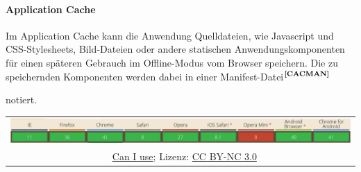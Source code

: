 \paragraph{Application Cache}
Im Application Cache kann die Anwendung Quelldateien, wie Javascript und CSS-Stylesheets, Bild-Dateien oder andere statischen Anwendungskomponenten für einen späteren Gebrauch im Offline-Modus vom Browser speichern. Die zu speichernden Komponenten werden dabei in einer Manifest-Datei$^{\textbf{\ref{CACMAN}}}$%
\addtocounter{footnote}{1}%
notiert. 
	\begin{table}[H]
  		\begin{adjustwidth}{-1.5cm}{1.5cm}
		\centering
		\begin{tabulary}{20cm}{C}
	  		\includegraphics[scale=0.6]{bilder/screenshots/caniuse_appcache.png}\\ 
				\ccLogo\ 
				\begingroup
    				\fontsize{8pt}{12pt}\selectfont
    				\href{http://caniuse.com/\#search=Application\%20Cache}{Can I use}; Lizenz: \href{http://creativecommons.org/licenses/by-nc/3.0/}{CC BY-NC 3.0} 
				\endgroup
		\end{tabulary}
  		\end{adjustwidth}
	\end{table}

